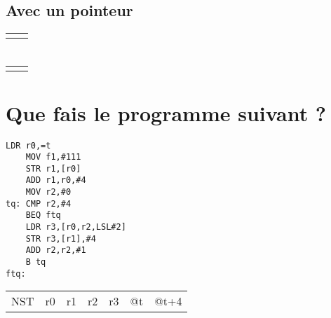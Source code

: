 \documentclass[12pt,a4paper,openany]{book}
\begin{document}
\subsection{Avec un pointeur}
\begin{tabular}{p{6cm}p{6cm}}

	&

\end{tabular}
\section{}
\begin{tabular}{p{6cm}p{6cm}}

	&

\end{tabular}
\section{Que fais le programme suivant ? }
\begin{lstlisting}[language=ARM]
	LDR r0,=t
	MOV f1,#111
	STR r1,[r0]
	ADD r1,r0,#4
	MOV r2,#0
tq: CMP r2,#4
	BEQ ftq
	LDR r3,[r0,r2,LSL#2]
	STR r3,[r1],#4
	ADD r2,r2,#1
	B tq
ftq:
\end{lstlisting}
\begin{tabular}{ccccccc}
	NST & r0 & r1 & r2 & r3& @t & @t+4
\end{tabular}
\end{document}
